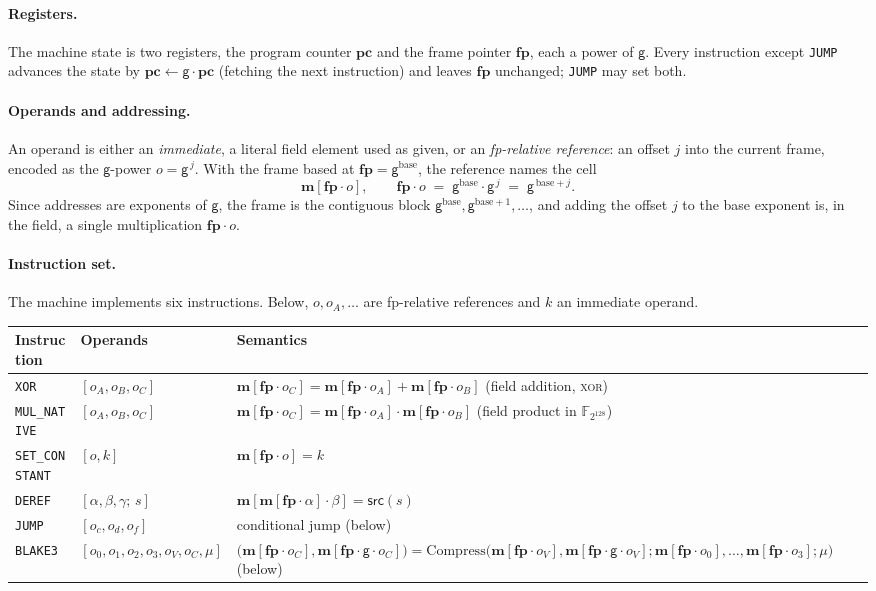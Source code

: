\documentclass[11pt]{article}
\newcommand{\F}{\mathbb{F}}
\newcommand{\gen}{\mathsf{g}}
\newcommand{\loc}[1]{\mem[\fp\cdot #1]}
\newcommand{\pc}{\mathbf{pc}}
\newcommand{\fp}{\mathbf{fp}}
\newcommand{\mem}{\mathbf{m}}
\newcommand{\srcsel}[1]{\mathsf{src}(#1)}
\begin{document}
\paragraph{Registers.} The machine state is two registers, the program counter $\pc$ and the frame pointer $\fp$, each a power of $\gen$. Every instruction except \texttt{JUMP} advances the state by $\pc\gets\gen\cdot\pc$ (fetching the next instruction) and leaves $\fp$ unchanged; \texttt{JUMP} may set both.

\paragraph{Operands and addressing.} An operand is either an \emph{immediate}, a literal field element used as given, or an \emph{fp-relative reference}: an offset $j$ into the current frame, encoded as the $\gen$-power $o=\gen^{\,j}$. With the frame based at $\fp=\gen^{\mathrm{base}}$, the reference names the cell
\[
  \mem[\fp\cdot o],\qquad \fp\cdot o\;=\;\gen^{\mathrm{base}}\cdot\gen^{\,j}\;=\;\gen^{\,\mathrm{base}+j}.
\]
Since addresses are exponents of $\gen$, the frame is the contiguous block $\gen^{\mathrm{base}},\gen^{\mathrm{base}+1},\dots$, and adding the offset $j$ to the base exponent is, in the field, a single multiplication $\fp\cdot o$.

\paragraph{Instruction set.} The machine implements six instructions. Below, $o,o_A,\dots$ are fp-relative references and $k$ an immediate operand.
\begin{center}
\begin{tabular}{lll}
\hline
Instruction & Operands & Semantics\\
\hline
\texttt{XOR}           & $[o_A,o_B,o_C]$ & $\loc{o_C}=\loc{o_A}+\loc{o_B}$ \quad(field addition, \textsc{xor})\\
\texttt{MUL\_NATIVE}   & $[o_A,o_B,o_C]$ & $\loc{o_C}=\loc{o_A}\cdot\loc{o_B}$ \quad(field product in $\F_{2^{128}}$)\\
\texttt{SET\_CONSTANT} & $[o,k]$         & $\loc{o}=k$\\
\texttt{DEREF}         & $[\alpha,\beta,\gamma;\,s]$ & $\mem[\loc{\alpha}\cdot\beta]=\srcsel{s}$\\
\texttt{JUMP}          & $[o_c,o_d,o_f]$ & conditional jump (below)\\
\texttt{BLAKE3}        & $[o_0,o_1,o_2,o_3,o_V,o_C,\mu]$ & $\bigl(\loc{o_C},\loc{\gen\cdot o_C}\bigr)=\mathrm{Compress}\bigl(\loc{o_V},\loc{\gen\cdot o_V};\loc{o_0},\ldots,\loc{o_3};\mu\bigr)$ (below)\\
\hline
\end{tabular}
\end{center}
\end{document}
